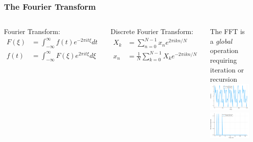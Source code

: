 \documentclass{beamer}
\begin{document}
\begin{frame}
\frametitle{The Fourier Transform}

\begin{columns}
Fourier Transform:
\begin{align*}
F(\xi) &= \int_{-\infty}^{\infty}f(t)e^{-2\pi i t \xi}dt\\
f(t) &= \int_{-\infty}^{\infty}F(\xi)e^{2\pi i t \xi}d\xi
\end{align*}

Discrete Fourier Transform:
\begin{align*}
X_k &= \sum_{n=0}^{N-1} x_ne^{2\pi i k n / N}\\
x_n &= \frac{1}{N}\sum_{k=0}^{N-1} X_ke^{-2\pi i k n / N}
\end{align*}

The FFT is a \textit{global} operation requiring iteration or recursion
\includegraphics[width=\textwidth]{time_0066.png}
\includegraphics[width=\textwidth]{freq_0066.png}
\end{columns}
\end{frame}
\end{document}
